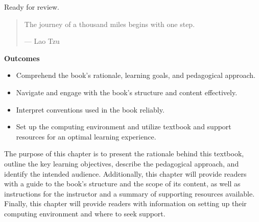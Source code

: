 \documentclass[
  letterpaper,
  DIV=11,
  numbers=noendperiod]{scrreport}
\providecommand{\tightlist}{%
  \setlength{\itemsep}{0pt}\setlength{\parskip}{0pt}}\usepackage{longtable,booktabs,array}
\theoremstyle{definition}
\theoremstyle{remark}
\begin{document}

\begin{tcolorbox}[enhanced jigsaw, breakable, arc=.35mm, opacityback=0, bottomrule=.15mm, colback=white, opacitybacktitle=0.6, colframe=quarto-callout-tip-color-frame, toptitle=1mm, colbacktitle=quarto-callout-tip-color!10!white, left=2mm, leftrule=.75mm, toprule=.15mm, title=\textcolor{quarto-callout-tip-color}{\faLightbulb}\hspace{0.5em}{Draft}, bottomtitle=1mm, coltitle=black, titlerule=0mm, rightrule=.15mm]

Ready for review.

\end{tcolorbox}

\begin{quote}
The journey of a thousand miles begins with one step.

--- Lao Tzu
\end{quote}

\begin{tcolorbox}[enhanced jigsaw, breakable, rightrule=.15mm, arc=.35mm, left=2mm, opacityback=0, leftrule=.75mm, toprule=.15mm, bottomrule=.15mm, colback=white]

\textbf{ Outcomes}

\begin{itemize}
\tightlist
\item
  Comprehend the book's rationale, learning goals, and pedagogical
  approach.
\item
  Navigate and engage with the book's structure and content effectively.
\item
  Interpret conventions used in the book reliably.
\item
  Set up the computing environment and utilize textbook and support
  resources for an optimal learning experience.
\end{itemize}

\end{tcolorbox}

The purpose of this chapter is to present the rationale behind this
textbook, outline the key learning objectives, describe the pedagogical
approach, and identify the intended audience. Additionally, this chapter
will provide readers with a guide to the book's structure and the scope
of its content, as well as instructions for the instructor and a summary
of supporting resources available. Finally, this chapter will provide
readers with information on setting up their computing environment and
where to seek support.
\end{document}
